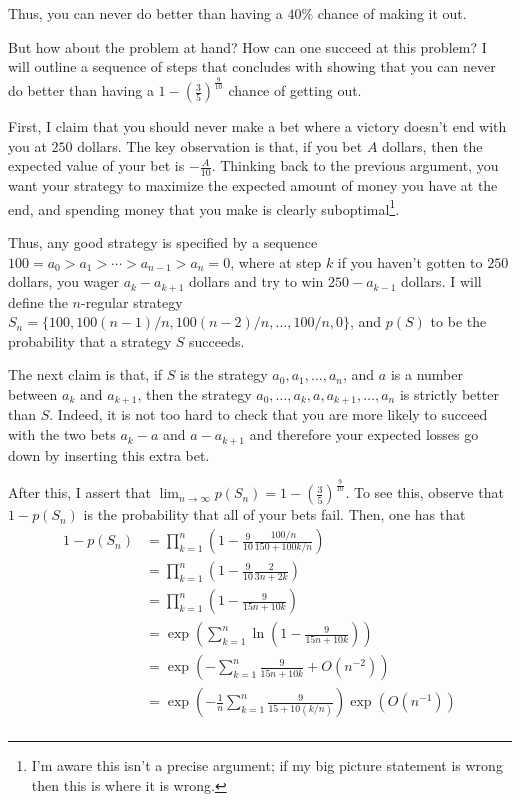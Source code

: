 \documentclass[11pt]{article}
\theoremstyle{definition}
\begin{document}
Thus, you can never do better than having a $40\%$ chance of making it out.

But how about the problem at hand?  How can one succeed at this problem?  I will outline a sequence of steps that concludes with showing that you can never do better than having a $\displaystyle{1-\left(\frac{3}{5}\right)^{\frac{9}{10}}}$ chance of getting out.

First, I claim that you should never make a bet where a victory doesn't end with you at $250$ dollars.  The key observation is that, if you bet $A$ dollars, then the expected value of your bet is $-\frac{A}{10}$.  Thinking back to the previous argument, you want your strategy to maximize the expected amount of money you have at the end, and spending money that you make is clearly suboptimal\footnote{I'm aware this isn't a precise argument; if my big picture statement is wrong then this is where it is wrong.}.

Thus, any good strategy is specified by a sequence $100 = a_0 > a_1 > \cdots > a_{n-1} > a_n = 0$, where at step $k$ if you haven't gotten to $250$ dollars, you wager $a_k-a_{k+1}$ dollars and try to win $250-a_{k-1}$ dollars.  I will define the $n$-regular strategy $S_n = \{100, 100(n-1)/n, 100(n-2)/n, \ldots, 100/n, 0\}$, and $p(S)$ to be the probability that a strategy $S$ succeeds.

The next claim is that, if $S$ is the strategy $a_0, a_1, \ldots, a_n$, and $a$ is a number between $a_k$ and $a_{k+1}$, then the strategy $a_0, \ldots, a_k, a, a_{k+1}, \ldots, a_n$ is strictly better than $S$.  Indeed, it is not too hard to check that you are more likely to succeed with the two bets $a_k - a$ and $a - a_{k+1}$ and therefore your expected losses go down by inserting this extra bet.

After this, I assert that $\displaystyle{\lim_{n \rightarrow \infty} p(S_n) = 1-\left(\frac{3}{5}\right)^{\frac{9}{10}}}$.  To see this, observe that $1-p(S_n)$ is the probability that all of your bets fail.  Then, one has that
\begin{align*}
1-p(S_n) & = \prod_{k = 1}^n \left(1 - \frac{9}{10}\frac{100/n}{150 + 100k/n}\right) \\
& = \prod_{k = 1}^n \left(1 - \frac{9}{10}\frac{2}{3n + 2k}\right) \\
& = \prod_{k = 1}^n \left(1 - \frac{9}{15n + 10k}\right) \\
& = \exp\left(\sum_{k = 1}^n\ln\left(1-\frac{9}{15n + 10k}\right)\right) \\
& = \exp\left(-\sum_{k = 1}^n\frac{9}{15n + 10k} + O(n^{-2})\right) \\
& = \exp\left(-\frac{1}{n}\sum_{k = 1}^n\frac{9}{15 + 10(k/n)}\right)\exp\left(O(n^{-1})\right) \\
\end{align*}
\end{document}

